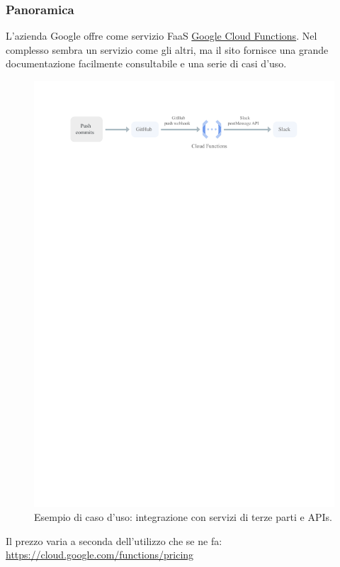 \documentclass[a4paper]{article}
\begin{document}
	\subsubsection{Panoramica}
	
	L'azienda Google offre come servizio FaaS \href{https://cloud.google.com/functions/}{Google Cloud Functions}. Nel complesso sembra un servizio come gli altri, ma il sito fornisce una grande documentazione facilmente consultabile e una serie di casi d'uso.
	\begin{figure}[!htp]
		\centering
		\includegraphics[width=\textwidth]{img/Google-1.pdf}
		\caption{Esempio di caso d'uso: integrazione con servizi di terze parti e APIs.}
	\end{figure}
	
	\noindent
	Il prezzo varia a seconda dell'utilizzo che se ne fa: \url{https://cloud.google.com/functions/pricing}
	
\end{document}
